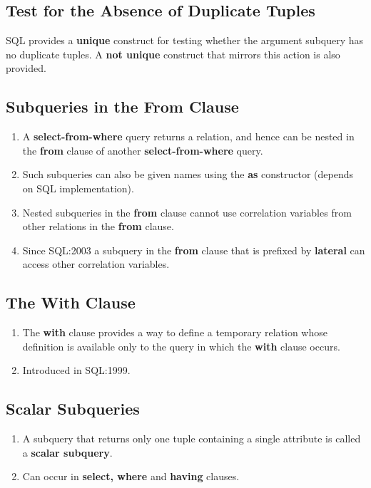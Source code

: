 \documentclass[journal,12pt,twocolumn]{IEEEtran}
\begin{document}
\subsection{Test for the Absence of Duplicate Tuples}

SQL provides a \textbf{unique} construct for testing whether the argument 
subquery has no duplicate tuples. A \textbf{not unique} construct that mirrors 
this action is also provided.

\subsection{Subqueries in the From Clause}
\begin{enumerate}
    \item A \textbf{select-from-where} query returns a relation, and hence can 
    be nested in the \textbf{from} clause of another \textbf{select-from-where} 
    query.
    \item Such subqueries can also be given names using the \textbf{as} 
    constructor (depends on SQL implementation).
    \item Nested subqueries in the \textbf{from} clause cannot use correlation 
    variables from other relations in the \textbf{from} clause.
    \item Since SQL:2003 a subquery in the \textbf{from} clause that is 
    prefixed by \textbf{lateral} can access other correlation variables.
\end{enumerate}

\subsection{The With Clause}
\begin{enumerate}
    \item The \textbf{with} clause provides a way to define a temporary relation 
    whose definition is available only to the query in which the \textbf{with} 
    clause occurs.
    \item Introduced in SQL:1999.
\end{enumerate}

\subsection{Scalar Subqueries}
\begin{enumerate}
    \item A subquery that returns only one tuple containing a single attribute 
    is called a \textbf{scalar subquery}.
    \item Can occur in \textbf{select, where} and \textbf{having} clauses.
\end{enumerate}
\end{document}
